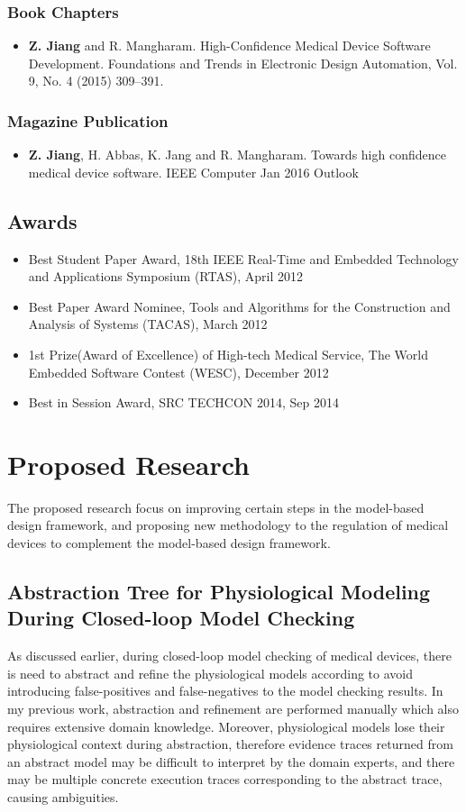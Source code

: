 \documentclass[a4paper]{article}
\begin{document}
\subsubsection{Book Chapters}
\begin{itemize}
\item \textbf{Z. Jiang} and R. Mangharam. High-Confidence Medical Device Software
Development. Foundations and Trends in Electronic Design Automation, Vol. 9, No. 4 (2015) 309–391.
\end{itemize}
\subsubsection{Magazine Publication}
\begin{itemize}
\item \textbf{Z. Jiang}, H. Abbas, K. Jang and R. Mangharam. Towards high confidence medical device software. IEEE Computer Jan 2016 Outlook
\end{itemize}
\subsection{Awards}

\begin{itemize}
	\item Best Student Paper Award, 18th IEEE Real-Time and Embedded Technology and Applications Symposium (RTAS), April 2012
	\item Best Paper Award Nominee, Tools and Algorithms for the Construction and Analysis of Systems (TACAS), March 2012
	\item 1st Prize(Award of Excellence) of High-tech Medical Service, The World Embedded Software Contest (WESC), December 2012
	\item Best in Session Award, SRC TECHCON 2014, Sep 2014
\end{itemize}

\newpage

\section{Proposed Research}
The proposed research focus on improving certain steps in the model-based design framework, and proposing new methodology to the regulation of medical devices to complement the model-based design framework.
\subsection{Abstraction Tree for Physiological Modeling During Closed-loop Model Checking}
As discussed earlier, during closed-loop model checking of medical devices, there is need to abstract and refine the physiological models according to avoid introducing false-positives and false-negatives to the model checking results.
In my previous work, abstraction and refinement are performed manually which also requires extensive domain knowledge.
Moreover, physiological models lose their physiological context during abstraction, therefore evidence traces returned from an abstract model may be difficult to interpret by the domain experts, and there may be multiple concrete execution traces corresponding to the abstract trace, causing ambiguities.
\end{document}
